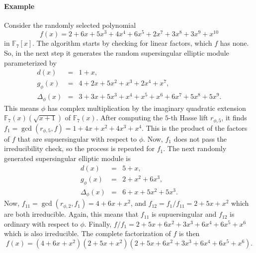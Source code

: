 \documentclass[12pt]{article}
\theoremstyle{plain}
\theoremstyle{definition}
\def\F{\ensuremath{\mathbb{F}}}
\begin{document}
\paragraph{Example}
Consider the randomly selected polynomial 
\[ f(x) = 2 + 6x + 5x^3 + 4x^4 + 6x^5 + 2x^7 + 3x^8 + 3x^9 + x^{10} \]
in $\F_7[x]$. The algorithm starts by checking for linear factors, which $f$ has none. So, in the 
next step it generates the random supersingular elliptic module parameterized by
\[
\begin{array}{rll}
	d(x) & = & 1 + x, \\
	g_\phi(x) & = & 4 + 2x + 5x^2 + x^3 + 2x^4 + x^7, \\
	\Delta_\phi(x) & = & 3 + 3x + 5x^3 + x^4 + x^5 + x^6 + 6x^7 + 5x^8 + 5x^9.
\end{array}
\]
This means $\phi$ has complex multiplication by the imaginary quadratic extension $\F_7(x)(\sqrt{x 
+ 1})$ of $\F_7(x)$. After computing the $5$-th Hasse lift $r_{\phi, 5}$, it finds $f_1 = 
\gcd(r_{\phi, 5}, f) = 1 + 4x + x^2 + 4x^3 + x^4$. This is the product of the factors of $f$ that 
are supuersingular with respect to $\phi$. Now, $f_1$ does not pass the irreducibility check, so 
the process is repeated for $f_1$. The next randomly generated supersingular elliptic module is
\[
\begin{array}{rll}
	d(x) & = & 5 + x, \\
	g_\phi(x) & = & 2 + x^2 + 6x^3, \\
	\Delta_\phi(x) & = & 6 + x + 5x^2 + 5x^3.
\end{array}
\]
Now, $f_{11} = \gcd(r_{\phi, 2}, f_1) = 4 + 6x + x^2$, and $f_{12} = f_1 / f_{11} = 2 + 5x + x^2$ 
which are both irreducible. Again, this means that $f_{11}$ is supuersingular and $f_{12}$ is 
ordinary with respect to $\phi$. Finally, $f / f_1 = 2 + 5x + 6x^2 + 3x^3 + 6x^4 + 6x^5 + x^6$ 
which is also irreducible. The complete factorization of $f$ is then
\[ f(x) = (4 + 6x + x^2)(2 + 5x + x^2)(2 + 5x + 6x^2 + 3x^3 + 6x^4 + 6x^5 + x^6).\]




\end{document}
